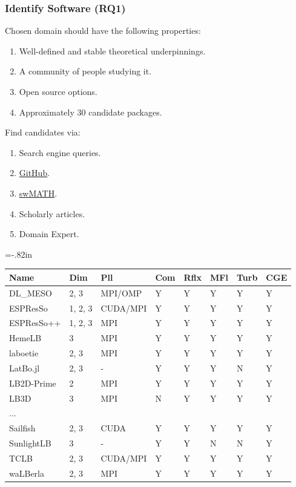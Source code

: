 \documentclass[usenames,dvipsnames]{beamer}
\begin{document}
\begin{frame}

  \frametitle{Identify Software (RQ1)}

  Chosen domain should have the following properties:

  \begin{enumerate}
  \item Well-defined and stable theoretical underpinnings.
  \item A community of people studying it.
  \item Open source options.
  \item Approximately 30 candidate packages.
  \end{enumerate}	
  
  Find candidates via:
  
  \begin{enumerate}
    \item Search engine queries.
    \item \href{https://github.com/} {GitHub}.
    \item \href{https://swmath.org/} {swMATH}.
    \item Scholarly articles.
    \item Domain Expert.
  \end{enumerate}

\end{frame}


\hoffset=-.82in %
\begin{frame}[plain]

  \begin{tabular}{ p{2.15cm}p{1.15cm}p{1.95cm}lllll}
    \toprule
    Name & Dim & Pll & Com & Rflx & MFl & Turb & CGE \\
    \midrule
    DL\_MESO & 2, 3 & MPI/OMP & Y & Y & Y & Y & Y \\
    ESPResSo & 1, 2, 3 & CUDA/MPI & Y & Y & Y & Y & Y \\
    ESPResSo++ & 1, 2, 3 & MPI & Y & Y & Y & Y & Y \\
    HemeLB & 3 & MPI & Y & Y & Y & Y & Y \\
    laboetie & 2, 3 & MPI & Y & Y & Y & Y & Y \\
    LatBo.jl & 2, 3 & - & Y & Y & Y & N & Y \\
    LB2D-Prime & 2 & MPI & Y & Y & Y & Y & Y \\
    LB3D & 3 & MPI & N & Y & Y & Y & Y \\
    ... &  &  &  &  &  &  & \\
    Sailfish & 2, 3 & CUDA & Y & Y & Y & Y & Y \\
    SunlightLB & 3 & - & Y & Y & N & N & Y \\
    TCLB & 2, 3 & CUDA/MPI & Y & Y & Y & Y & Y \\
    waLBerla & 2, 3 & MPI & Y & Y & Y & Y & Y \\
    \bottomrule
  \end{tabular}

\end{frame}
\hoffset=0in %
\end{document}
